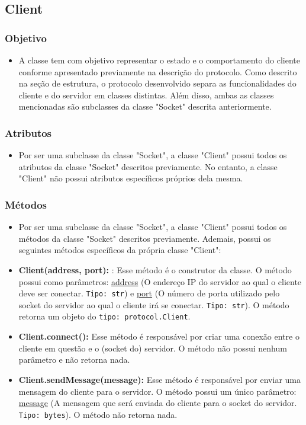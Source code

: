 \documentclass[10pt]{article}
\begin{document}
\begin{itemize}
    \subsection{\Large Client}
        \subsubsection{\large Objetivo}
            \begin{itemize}
            \item A classe tem com objetivo representar o estado e o comportamento do cliente conforme apresentado previamente na descrição do protocolo. Como descrito na seção de estrutura, o protocolo desenvolvido separa as funcionalidades do cliente e do servidor em classes distintas. Além disso, ambas as classes mencionadas são subclasses da classe "Socket" descrita anteriormente.
            \end{itemize}
        \subsubsection{\large Atributos}
            \begin{itemize}
            \item Por ser uma subclasse da classe "Socket", a classe "Client" possui todos os atributos da classe "Socket" descritos previamente. No entanto, a classe "Client" não possui atributos específicos próprios dela mesma.
            \end{itemize}
        \subsubsection{\large Métodos}
            \begin{itemize}
            \item Por ser uma subclasse da classe "Socket", a classe "Client" possui todos os métodos da classe "Socket" descritos previamente. Ademais, possui os seguintes métodos específicos da própria classe "Client":
            \item \textbf{Client(address, port):} : Esse método é o construtor da classe. O método possui como parâmetros: \underline{address} (O endereço IP do servidor ao qual o cliente deve ser conectar. \texttt{Tipo: str}) e \underline{port} (O número de porta utilizado pelo socket do servidor ao qual o cliente irá se conectar. \texttt{Tipo: str}).  O método retorna um objeto do \texttt{tipo: protocol.Client}.
            \item \textbf{Client.connect():} Esse método é responsável por criar uma conexão entre o cliente em questão e o (socket do) servidor. O método não possui nenhum parâmetro e não retorna nada.
            \item \textbf{Client.sendMessage(message):} Esse método é responsável por enviar uma mensagem do cliente para o servidor. O método possui um único parâmetro: \underline{message} (A mensagem que será enviada do cliente para o socket do servidor. \texttt{Tipo: bytes}). O método não retorna nada.
            \end{itemize}
        

\end{itemize}
\end{document}
